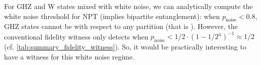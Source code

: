 \documentclass[
aps,
pra,
twocolumn,
floatfix,
]{revtex4-2}
\theoremstyle{plain}
\newtheorem{proposition}{Proposition}
\theoremstyle{definition}
\newcommand{\ew}{W}
\newcommand{\dm}{\rho}
\newcommand{\noise}{\text{noise}}
\begin{document}

For GHZ and W states mixed with white noise, we can analytically compute the white noise threshold for NPT (implies bipartite entanglement):
when $p_{\noise}<0.8$, GHZ states cannot be  with respect to any partition (that is ).
However, the conventional fidelity witness only detects  when $p_{\noise}<1/2 \cdot (1-1/2^n)^{-1}\approx 1/2$ (cf. \cref{tab:summary_fidelity_witness}).
So, it would be practically interesting to have a witness for this white noise regime.
\end{document}
